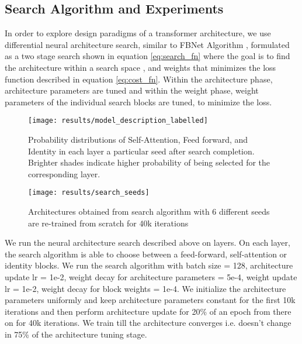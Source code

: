 \documentclass{article}
\begin{document}
\subsection{Search Algorithm and Experiments} \label{observations}

In order to explore design paradigms of a transformer architecture, we use differential neural architecture search, similar to FBNet Algorithm \cite{fbnet}, formulated as a two stage search shown in equation \ref{eq:search_fn} where the goal is to find the architecture  within a search space , and weights  that minimizes the loss function  described in equation \ref{eq:cost_fn}. Within the architecture phase, architecture parameters  are tuned and within the weight phase, weight parameters of the individual search blocks are tuned, to minimize the loss.



\begin{figure}[t]
\begin{minipage}[t]{0.48\textwidth}
\texttt{[image: results/model\_description\_labelled]}
\caption{ Probability distributions of Self-Attention, Feed forward, and Identity in each layer a particular seed after search completion. Brighter shades indicate higher probability of being selected for the corresponding layer.}
\label{fig:nas}
\end{minipage}
\hspace*{\fill}
\begin{minipage}[t]{0.48\textwidth}
\texttt{[image: results/search\_seeds]}
\caption{Architectures obtained from search algorithm with 6 different seeds are re-trained from scratch for 40k iterations}
\label{fig:nas_seeds}
\end{minipage}
\end{figure}

We run the neural architecture search described above on  layers. On each layer, the search algorithm is able to choose between a feed-forward, self-attention or identity blocks. We run the search algorithm with batch size = 128, architecture update lr = 1e-2, weight decay for architecture parameters = 5e-4, weight update lr = 1e-2, weight decay for block weights = 1e-4. We initialize the architecture parameters uniformly and keep architecture parameters constant for the first 10k iterations and then perform architecture update for 20\% of an epoch from there on for 40k iterations. We train till the architecture converges i.e. doesn't change in 75\% of the architecture tuning stage.
\end{document}
